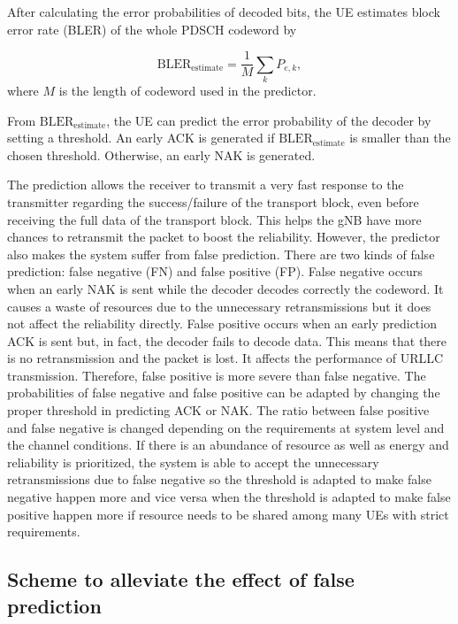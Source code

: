 \documentclass[conference]{IEEEtran}
\begin{document}
After calculating the error probabilities of decoded bits, the UE estimates block error rate (BLER) of the whole PDSCH codeword by

\begin{equation}
   \mathrm{BLER}_{\mathrm{estimate}} = \frac{1}{M} \sum_{k} P_{e,k},
\end{equation}
where $M$ is the length of codeword used in the predictor.

From $\mathrm{BLER}_{\mathrm{estimate}}$, the UE can predict the error probability of the decoder by setting a threshold. An early ACK is generated if $\mathrm{BLER}_{\mathrm{estimate}}$ is smaller than the chosen threshold. Otherwise, an early NAK is generated. 

The prediction allows the receiver to transmit a very fast response to the transmitter regarding the success/failure of the transport block, even before receiving the full data of the transport block. This helps the gNB have more chances to retransmit the packet to boost the reliability. However, the predictor also makes the system suffer from false prediction. There are two kinds of false prediction: false negative (FN) and false positive (FP). False negative occurs when an early NAK is sent while the decoder decodes correctly the codeword. It causes a waste of resources due to the unnecessary retransmissions but it does not affect the reliability directly. False positive occurs when an early prediction ACK is sent but, in fact, the decoder fails to decode data. This means that there is no retransmission and the packet is lost. It affects the performance of URLLC transmission. Therefore, false positive is more severe than false negative. The probabilities of false negative and false positive can be adapted by changing the proper threshold in predicting ACK or NAK. The ratio between false positive and false negative is changed depending on the requirements at system level and the channel conditions.  If there is an abundance of resource as well as energy and reliability is prioritized, the system is able to accept the unnecessary retransmissions due to false negative so the threshold is adapted to make false negative happen more and vice versa when the threshold is adapted to make false positive happen more if resource needs to be shared among many UEs with strict requirements.

\subsection{Scheme to alleviate the effect of false prediction}\label{CC}
\end{document}
